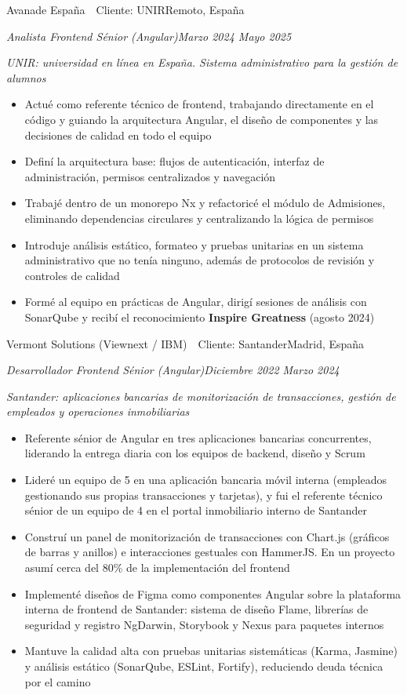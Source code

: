 \documentclass[10pt,a4paper]{article}
\newcommand{\job}[4]{%
  \vspace{5pt}%
  {\latosemibold\color{dark}#1\hfill{\latolight\small\color{light}#2}}\par
  {\itshape\small\color{mid}#3\hfill{\latolight\small\color{light}#4}}\par\vspace{2pt}%
}
\newcommand{\context}[1]{%
  {\latolight\itshape\small\color{mid}\hspace{0.8em}#1}\vspace{2pt}%
}
\newenvironment{items}{%
  \begin{itemize}[leftmargin=1.2em, itemsep=0pt, topsep=2pt, parsep=0pt, label={\color{light}\textbullet}]
    \normalsize\color{dark}
}{%
  \end{itemize}%
}
\begin{document}
\job{Avanade España \,\textperiodcentered\, Cliente: UNIR}{Remoto, España}{Analista Frontend Sénior (Angular)}{Marzo 2024 \textendash{} Mayo 2025}
\context{UNIR: universidad en línea en España. Sistema administrativo para la gestión de alumnos}
\begin{items}
  \item Actué como referente técnico de frontend, trabajando directamente en el código y guiando la arquitectura Angular, el diseño de componentes y las decisiones de calidad en todo el equipo
  \item Definí la arquitectura base: flujos de autenticación, interfaz de administración, permisos centralizados y navegación
  \item Trabajé dentro de un monorepo Nx y refactoricé el módulo de Admisiones, eliminando dependencias circulares y centralizando la lógica de permisos
  \item Introduje análisis estático, formateo y pruebas unitarias en un sistema administrativo que no tenía ninguno, además de protocolos de revisión y controles de calidad
  \item Formé al equipo en prácticas de Angular, dirigí sesiones de análisis con SonarQube y recibí el reconocimiento \textbf{Inspire Greatness} (agosto 2024)
\end{items}

\newpage
\job{Vermont Solutions (Viewnext / IBM) \,\textperiodcentered\, Cliente: Santander}{Madrid, España}{Desarrollador Frontend Sénior (Angular)}{Diciembre 2022 \textendash{} Marzo 2024}
\context{Santander: aplicaciones bancarias de monitorización de transacciones, gestión de empleados y operaciones inmobiliarias}
\begin{items}
  \item Referente sénior de Angular en tres aplicaciones bancarias concurrentes, liderando la entrega diaria con los equipos de backend, diseño y Scrum
  \item Lideré un equipo de 5 en una aplicación bancaria móvil interna (empleados gestionando sus propias transacciones y tarjetas), y fui el referente técnico sénior de un equipo de 4 en el portal inmobiliario interno de Santander
  \item Construí un panel de monitorización de transacciones con Chart.js (gráficos de barras y anillos) e interacciones gestuales con HammerJS. En un proyecto asumí cerca del 80\% de la implementación del frontend
  \item Implementé diseños de Figma como componentes Angular sobre la plataforma interna de frontend de Santander: sistema de diseño Flame, librerías de seguridad y registro NgDarwin, Storybook y Nexus para paquetes internos
  \item Mantuve la calidad alta con pruebas unitarias sistemáticas (Karma, Jasmine) y análisis estático (SonarQube, ESLint, Fortify), reduciendo deuda técnica por el camino
\end{items}
\end{document}
